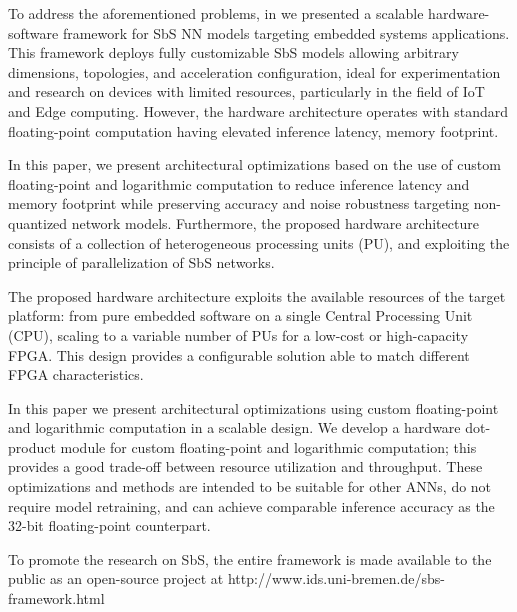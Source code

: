 To address the aforementioned problems, in \cite{nevarez2020accelerator} we presented a scalable hardware-software framework for SbS NN models targeting embedded systems applications. This framework deploys fully customizable SbS models allowing arbitrary dimensions, topologies, and acceleration configuration, ideal for experimentation and research on devices with limited resources, particularly in the field of IoT and Edge computing. However, the hardware architecture operates with standard floating-point computation having elevated inference latency, memory footprint.

In this paper, we present architectural optimizations based on the use of custom floating-point and logarithmic computation to reduce inference latency and memory footprint while preserving accuracy and noise robustness targeting non-quantized network models. Furthermore, the proposed hardware architecture consists of a collection of heterogeneous processing units (PU), and exploiting the principle of parallelization of SbS networks.

The proposed hardware architecture exploits the available resources of the target platform: from pure embedded software on a single Central Processing Unit (CPU), scaling to a variable number of PUs for a low-cost or high-capacity FPGA. This design provides a configurable solution able to match different FPGA characteristics.

In this paper we present architectural optimizations using custom floating-point and logarithmic computation in a scalable design. We develop a hardware dot-product module for custom floating-point and logarithmic computation; this provides a good trade-off between resource utilization and throughput. These optimizations and methods are intended to be suitable for other ANNs, do not require model retraining, and can achieve comparable inference accuracy as the 32-bit floating-point counterpart.


To promote the research on SbS, the entire framework is made available to the public as an open-source project at http://www.ids.uni-bremen.de/sbs-framework.html


